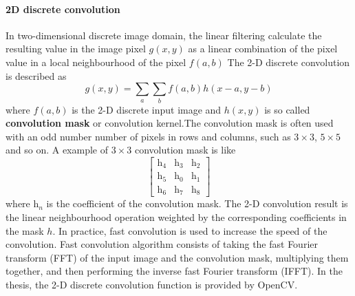 \paragraph{2D discrete convolution}
In two-dimensional discrete image domain, the linear filtering calculate the resulting value in the image pixel $g(x,y)$ as a linear combination of the pixel value in a local neighbourhood of the pixel $f(a,b)$  The 2-D discrete convolution is described as
\begin{equation}
g(x,y)=\sum_{a}\sum_{b}f(a,b)h(x-a,y-b)
\end{equation}
where $f(a,b)$ is the 2-D discrete input image and $h(x,y)$ is so called \textbf{convolution mask} or convolution kernel.The convolution mask is often used with an odd number number of pixels in rows and columns, such as $3\times3$, $5\times5$ and so on. A example \cite{Davies1990} of $3\times3$ convolution mask is like
\begin{displaymath}
 \left[  \begin{array}{ccc}
          \mathrm{h}_{4} &\mathrm{h}_{3} & \mathrm{h}_{2} \\
	  \mathrm{h}_{5} & \mathrm{h}_{0} & \mathrm{h}_{1} \\
	  \mathrm{h}_{6} & \mathrm{h}_{7} & \mathrm{h}_{8} 
         \end{array}
\right ]
\end{displaymath}
where $\mathrm{h}_{n}$ is the coefficient of the convolution mask. The 2-D convolution result is the linear neighbourhood operation weighted by the corresponding coefficients in the mask $h$. In practice, fast convolution is used to increase the speed of the convolution. Fast convolution algorithm consists of taking the fast Fourier transform (FFT) of the input image and the convolution mask, multiplying them together, and then performing the inverse fast Fourier transform (IFFT). In the thesis, the 2-D discrete convolution function is provided by OpenCV\cite{}.
